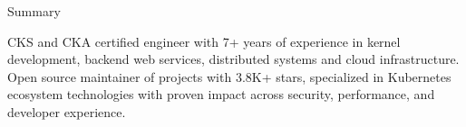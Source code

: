 \documentclass{resume} %
\begin{document}

\begin{rSection}{Summary}
  \begin{rSummarySection}
  {
    \item CKS and CKA certified engineer with 7+ years of experience in kernel development, backend web services, distributed systems and cloud infrastructure. Open source maintainer of projects with 3.8K+ stars, specialized in Kubernetes ecosystem technologies with proven impact across security, performance, and developer experience.
  }
  \end{rSummarySection}
\end{rSection}

\end{document}
